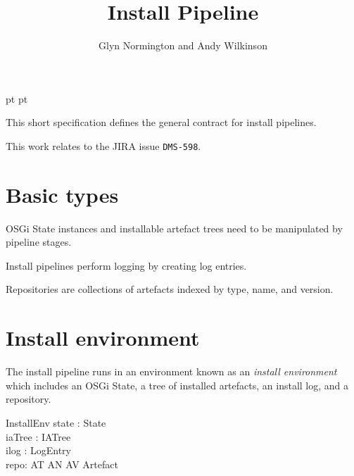 \documentclass[a4paper,twoside,12pt]{article}
\begin{document}
 pt
 pt

\title{Install Pipeline}
\author{Glyn Normington and Andy Wilkinson}
\maketitle
\thispagestyle{myheadings}
\setcounter{page}{0}

This short specification defines the general contract for install pipelines.

This work relates to the JIRA issue \texttt{DMS-598}.


\newcommand{\true}{true}
\newcommand{\false}{false}


\clearpage
{}

\section{Basic types}
OSGi State instances and installable artefact trees need to be manipulated by pipeline stages.
\begin{zed}
\end{zed}

Install pipelines perform logging by creating log entries.
\begin{zed}
 	[LogEntry]
\end{zed}

Repositories are collections of artefacts indexed by type, name, and version.
\begin{zed}
	[Artefact, AT, AN, AV]
\end{zed}

\clearpage
\section{Install environment}
The install pipeline runs in an environment known as an \textit{install environment} which includes
an OSGi State, a tree of installed artefacts, an install log, and a repository.
\begin{schema}{InstallEnv}
 state : State \\
 iaTree : IATree \\
 ilog : \seq LogEntry \\
 repo: AT \cross AN \cross AV \pinj Artefact
\end{schema}
\end{document}
